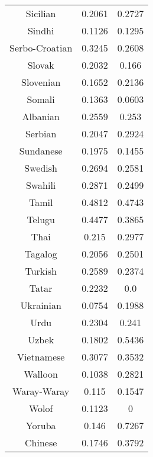 \begin{figure}[h]
\begin{tabular}{ccc}
Sicilian&0.2061&0.2727\\
Sindhi&0.1126&0.1295\\
Serbo-Croatian&0.3245&0.2608\\
Slovak&0.2032&0.166\\
Slovenian&0.1652&0.2136\\
Somali&0.1363&0.0603\\
Albanian&0.2559&0.253\\
Serbian&0.2047&0.2924\\
Sundanese&0.1975&0.1455\\
Swedish&0.2694&0.2581\\
Swahili&0.2871&0.2499\\
Tamil&0.4812&0.4743\\
Telugu&0.4477&0.3865\\
Thai&0.215&0.2977\\
Tagalog&0.2056&0.2501\\
Turkish&0.2589&0.2374\\
Tatar&0.2232&0.0\\
Ukrainian&0.0754&0.1988\\
Urdu&0.2304&0.241\\
Uzbek&0.1802&0.5436\\
Vietnamese&0.3077&0.3532\\
Walloon&0.1038&0.2821\\
Waray-Waray&0.115&0.1547\\
Wolof&0.1123&0\\
Yoruba&0.146&0.7267\\
Chinese&0.1746&0.3792\\
\hline\hline
\end{tabular}
\end{figure}
